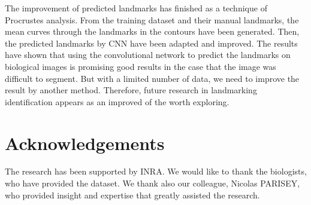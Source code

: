 \documentclass[10pt]{article}
\begin{document}
The improvement of predicted landmarks has finished as a technique of Procrustes analysis. From the training dataset and their manual landmarks, the mean curves through the landmarks in the contours have been generated. Then, the predicted landmarks by CNN have been adapted and improved. The results have shown that using the convolutional network to predict the landmarks on biological images is promising good results in the case that the image was difficult to segment. But with a limited number of data, we need to improve the result by another method. Therefore, future research in landmarking identification appears as an improved of the worth exploring.

\section*{Acknowledgements}
The research has been supported by INRA. We would like to thank the biologists, who have provided the dataset. We thank also our colleague, Nicolas PARISEY, who provided insight and expertise that greatly assisted the research.


\end{document}
